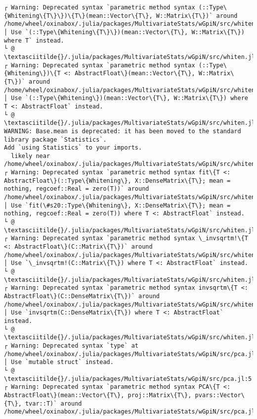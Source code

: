 \documentclass[11pt]{article}
\begin{document}
\begin{Verbatim}[commandchars=\\\{\}]
┌ Warning: Deprecated syntax `parametric method syntax (::Type\{Whitening\{T\}\})\{T\}(mean::Vector\{T\}, W::Matrix\{T\})` around /home/wheel/oxinabox/.julia/packages/MultivariateStats/wGpiN/src/whiten.jl:28.
│ Use `(::Type\{Whitening\{T\}\})(mean::Vector\{T\}, W::Matrix\{T\}) where T` instead.
└ @ \textasciitilde{}/.julia/packages/MultivariateStats/wGpiN/src/whiten.jl:28
┌ Warning: Deprecated syntax `parametric method syntax (::Type\{Whitening\})\{T <: AbstractFloat\}(mean::Vector\{T\}, W::Matrix\{T\})` around /home/wheel/oxinabox/.julia/packages/MultivariateStats/wGpiN/src/whiten.jl:35.
│ Use `(::Type\{Whitening\})(mean::Vector\{T\}, W::Matrix\{T\}) where T <: AbstractFloat` instead.
└ @ \textasciitilde{}/.julia/packages/MultivariateStats/wGpiN/src/whiten.jl:35
WARNING: Base.mean is deprecated: it has been moved to the standard library package `Statistics`.
Add `using Statistics` to your imports.
  likely near /home/wheel/oxinabox/.julia/packages/MultivariateStats/wGpiN/src/whiten.jl:39
┌ Warning: Deprecated syntax `parametric method syntax fit\{T <: AbstractFloat\}(::Type\{Whitening\}, X::DenseMatrix\{T\}; mean = nothing, regcoef::Real = zero(T))` around /home/wheel/oxinabox/.julia/packages/MultivariateStats/wGpiN/src/whiten.jl:47.
│ Use `fit(\#s20::Type\{Whitening\}, X::DenseMatrix\{T\}; mean = nothing, regcoef::Real = zero(T)) where T <: AbstractFloat` instead.
└ @ \textasciitilde{}/.julia/packages/MultivariateStats/wGpiN/src/whiten.jl:47
┌ Warning: Deprecated syntax `parametric method syntax \_invsqrtm!\{T <: AbstractFloat\}(C::Matrix\{T\})` around /home/wheel/oxinabox/.julia/packages/MultivariateStats/wGpiN/src/whiten.jl:58.
│ Use `\_invsqrtm!(C::Matrix\{T\}) where T <: AbstractFloat` instead.
└ @ \textasciitilde{}/.julia/packages/MultivariateStats/wGpiN/src/whiten.jl:58
┌ Warning: Deprecated syntax `parametric method syntax invsqrtm\{T <: AbstractFloat\}(C::DenseMatrix\{T\})` around /home/wheel/oxinabox/.julia/packages/MultivariateStats/wGpiN/src/whiten.jl:70.
│ Use `invsqrtm(C::DenseMatrix\{T\}) where T <: AbstractFloat` instead.
└ @ \textasciitilde{}/.julia/packages/MultivariateStats/wGpiN/src/whiten.jl:70
┌ Warning: Deprecated syntax `type` at /home/wheel/oxinabox/.julia/packages/MultivariateStats/wGpiN/src/pca.jl:5.
│ Use `mutable struct` instead.
└ @ \textasciitilde{}/.julia/packages/MultivariateStats/wGpiN/src/pca.jl:5
┌ Warning: Deprecated syntax `parametric method syntax PCA\{T <: AbstractFloat\}(mean::Vector\{T\}, proj::Matrix\{T\}, pvars::Vector\{T\}, tvar::T)` around /home/wheel/oxinabox/.julia/packages/MultivariateStats/wGpiN/src/pca.jl:16.

\end{Verbatim}
\end{document}
